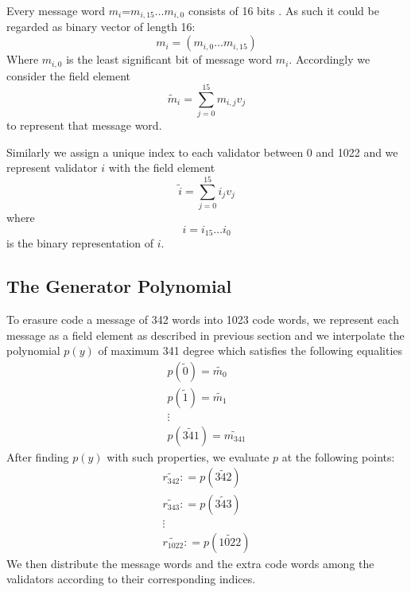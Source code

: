 Every message word $m_i$=$m_{i, 15} \ldots m_{i, 0}$ consists of 16 bits . As
such it could be regarded as binary vector of length 16:
\[ m_i = (m_{i, 0} \ldots m_{i, 15}) \]
Where $m_{i, 0}$ is the least significant bit of message word $m_i$.
Accordingly we consider the field element
\[ \tilde{m}_i = \sum^{15}_{j = 0} m_{i, j} v_j \]
to represent that message word.

Similarly we assign a unique index to each validator between 0 and 1022 and we
represent validator $i$ with the field element
\[ \tilde{i} = \sum^{15}_{j = 0} i_j v_j \]
where
\[ i = i_{15} \ldots i_0 \]
is the binary representation of $i$.

\subsection{The Generator Polynomial}

To erasure code a message of 342 words into 1023 code words, we represent each
message as a field element as described in previous section and we interpolate
the polynomial $p(y)$ of maximum 341 degree which satisfies the following
equalities
\[ \begin{array}{l}
     p (\tilde{0}) = \widetilde{m_0}\\
     p (\tilde{1}) = \widetilde{m_1}\\
     \vdots\\
     p (\widetilde{341}) = \widetilde{m_{341}}
   \end{array} \]
After finding $p(y)$ with such properties, we evaluate $p$ at the following
points:
\[ \begin{array}{l}
     \widetilde{r_{342}} : = p (\widetilde{342})\\
     \widetilde{r_{343}} : = p (\widetilde{343})\\
     \vdots\\
     \widetilde{r_{1022}} : = p (\widetilde{1022})
   \end{array} \]
We then distribute the message words and the extra code words among the
validators according to their corresponding indices.


